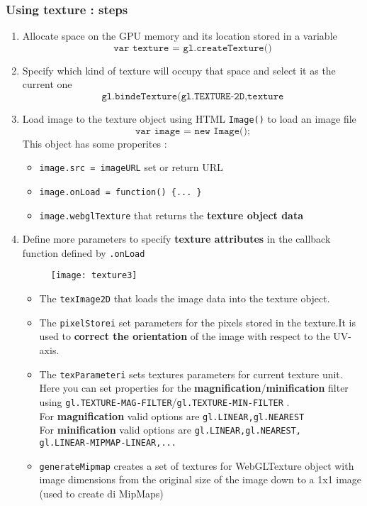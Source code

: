\subsubsection{Using texture : steps}
\begin{enumerate}
\item Allocate space on the GPU memory and its location stored in a variable
$$ \texttt{var texture = gl.createTexture()}$$
\item Specify which kind of texture will occupy that space and select it as the current one
$$ \texttt{gl.bindeTexture(gl.TEXTURE-2D,texture}$$
\item Load image to the texture object using HTML \texttt{Image()} to load an image file 
$$ \texttt{var image = new Image();}$$
This object has some properites :
\begin{itemize}
\item \texttt{image.src = imageURL} set or return URL
\item \texttt{image.onLoad = function() \{... \} }
\item \texttt{image.webglTexture} that returns the \textbf{texture object data}
\end{itemize}
\item Define more parameters to specify \textbf{texture attributes} in the callback function defined by \texttt{.onLoad}
\begin{figure}[H]
 \centering
 \texttt{[image: texture3]} 
\end{figure} 
\begin{itemize}
\item The \texttt{texImage2D} that loads the image data into the texture object.
\item The \texttt{pixelStorei} set parameters for the pixels stored in the texture.It is used to \textbf{correct the orientation} of the image with respect to the UV-axis.
\item The \texttt{texParameteri} sets textures parameters for current texture unit. Here you can set properties for the \textbf{magnification}/\textbf{minification} filter using \texttt{gl.TEXTURE-MAG-FILTER}/\texttt{gl.TEXTURE-MIN-FILTER} . \\For \textbf{magnification} valid options are \texttt{gl.LINEAR,gl.NEAREST}\\
For \textbf{minification} valid options are \texttt{gl.LINEAR,gl.NEAREST,\\ gl.LINEAR-MIPMAP-LINEAR,...}
\item \texttt{generateMipmap} creates a set of textures for WebGLTexture object with image dimensions from the original size of the image down to a 1x1 image (used to create di MipMaps)
\end{itemize}
\end{enumerate}
